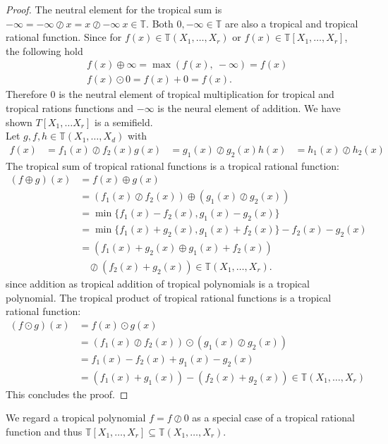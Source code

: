 \documentclass{article}
\theoremstyle{definition}
\begin{document}
\begin{proof}
The neutral element for the tropical sum is $- \infty = - \infty \oslash x = x \oslash - \infty \ x \in \mathbb{T}$. Both $0, -\infty \in \mathbb{T}$ are also a tropical and tropical rational function. Since for $f(x) \in \mathbb{T}(X_1, \dots , X_r)$ or $f(x) \in \mathbb{T}[X_1, \dots , X_r]$, the following hold
\begin{align*}
&f(x) \oplus \infty = \max(f(x),\ - \infty) = f(x) \\
&f(x) \odot 0 = f(x) + 0 = f(x).
\end{align*} 
Therefore $0$ is the neutral element of tropical multiplication for tropical and tropical rations functions and $-\infty$ is the neural element of addition. We have shown $T[X_1, \dots X_r]$ is a semifield. \\ 
Let $g,f,h \in \mathbb{T}(X_1, \dots ,X_d)$ with 
\begin{align*}
f(x) &= f_1(x) \oslash f_2(x)
g(x) &= g_1(x) \oslash g_2(x)
h(x) &= h_1(x) \oslash h_2(x)
\end{align*}
The tropical sum of tropical rational functions is a tropical rational function:
\begin{align*}
(f \oplus g)(x) &= f(x) \oplus g(x) \\
&=(f_1(x) \oslash f_2(x)) \oplus (g_1(x) \oslash g_2(x)) \\
&= \min\{f_1(x) - f_2(x), g_1(x) - g_2(x) \} \\
&= \min\{f_1(x) + g_2(x), g_1(x) + f_2(x) \} - f_2(x) - g_2(x) \\
&= (f_1(x) + g_2(x) \oplus g_1(x) + f_2(x)) \\
& \ \ \ \ \oslash (f_2(x) + g_2(x)) \in \mathbb{T}(X_1, \dots , X_r).
\end{align*}
since addition as tropical addition of tropical polynomials is a tropical polynomial.
The tropical product of tropical rational functions is a tropical rational function:
\begin{align*}
(f \odot g)(x) &= f(x) \odot g(x) \\
&=  (f_1(x) \oslash f_2(x)) \odot (g_1(x) \oslash g_2(x)) \\
&= f_1(x) - f_2(x) + g_1(x) - g_2(x) \\
&= (f_1(x) + g_1(x)) - (f_2(x) + g_2(x)) \in \mathbb{T}(X_1, \dots , X_r)
\end{align*}
This concludes the proof.
\end{proof}

We regard a tropical polynomial $f=f \oslash 0$ as a special case of a tropical rational function and thus $\mathbb{T}[X_1, \dots , X_r] \subseteq \mathbb{T}(X_1, \dots , X_r)$. \cite[p.~3]{zhang2018tropical}
\end{document}
